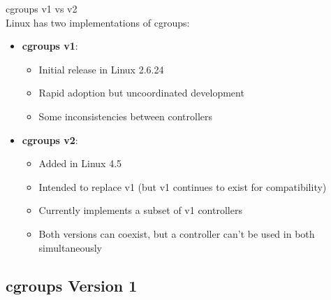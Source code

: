 \begin{definition}{cgroups v1 vs v2}\\
    Linux has two implementations of cgroups:
    \begin{itemize}
        \item \textbf{cgroups v1}:
            \begin{itemize}
                \item Initial release in Linux 2.6.24
                \item Rapid adoption but uncoordinated development
                \item Some inconsistencies between controllers
            \end{itemize}
        \item \textbf{cgroups v2}:
            \begin{itemize}
                \item Added in Linux 4.5
                \item Intended to replace v1 (but v1 continues to exist for compatibility)
                \item Currently implements a subset of v1 controllers
                \item Both versions can coexist, but a controller can't be used in both simultaneously
            \end{itemize}
    \end{itemize}
\end{definition}

\subsection{cgroups Version 1}

